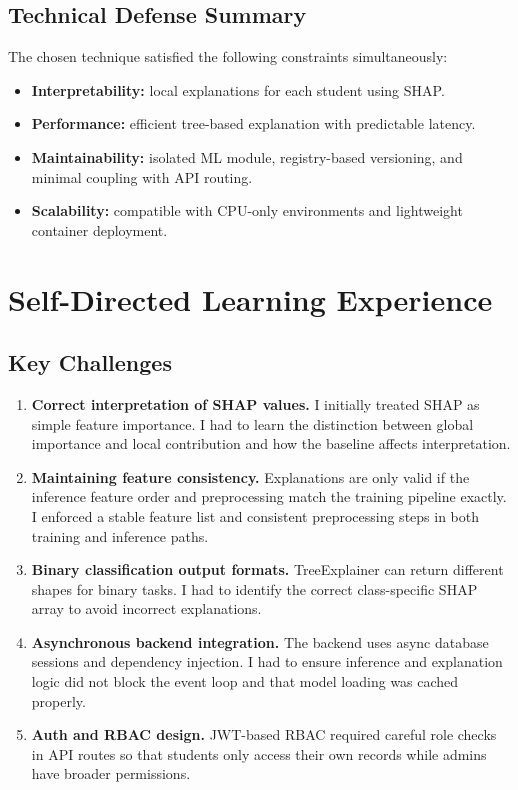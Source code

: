 \documentclass[12pt]{article}
\begin{document}
\subsection{Technical Defense Summary}
The chosen technique satisfied the following constraints simultaneously:
\begin{itemize}
  \item \textbf{Interpretability:} local explanations for each student using SHAP.
  \item \textbf{Performance:} efficient tree-based explanation with predictable latency.
  \item \textbf{Maintainability:} isolated ML module, registry-based versioning, and minimal coupling with API routing.
  \item \textbf{Scalability:} compatible with CPU-only environments and lightweight container deployment.
\end{itemize}

\section{Self-Directed Learning Experience}
\subsection{Key Challenges}
\begin{enumerate}
  \item \textbf{Correct interpretation of SHAP values.} I initially treated SHAP as simple feature importance. I had to learn the distinction between global importance and local contribution and how the baseline affects interpretation.
  \item \textbf{Maintaining feature consistency.} Explanations are only valid if the inference feature order and preprocessing match the training pipeline exactly. I enforced a stable feature list and consistent preprocessing steps in both training and inference paths.
  \item \textbf{Binary classification output formats.} TreeExplainer can return different shapes for binary tasks. I had to identify the correct class-specific SHAP array to avoid incorrect explanations.
  \item \textbf{Asynchronous backend integration.} The backend uses async database sessions and dependency injection. I had to ensure inference and explanation logic did not block the event loop and that model loading was cached properly.
  \item \textbf{Auth and RBAC design.} JWT-based RBAC required careful role checks in API routes so that students only access their own records while admins have broader permissions.
\end{enumerate}
\end{document}
